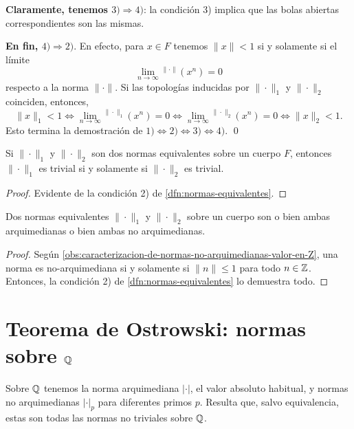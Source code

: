 \documentclass{article}
\numberwithin{equation}{section}
\theoremstyle{definition}
\begin{document}
\vspace{1em}

\noindent\textbf{Claramente, tenemos $3) \Rightarrow 4)$}: la condición 3)
implica que las bolas abiertas correspondientes son las mismas.

\vspace{1em}

\noindent\textbf{En fin, $4) \Rightarrow 2)$}. En efecto, para $x\in F$ tenemos
$\|x\| < 1$ si y solamente si el límite
$$\lim_{n\to\infty}\!\!{}^{\|\cdot\|} (x^n) = 0$$
respecto a la norma $\|\cdot\|$. Si las topologías inducidas por $\|\cdot\|_1$
y $\|\cdot\|_2$ coinciden, entonces,
\[ \|x\|_1 < 1 \iff
   \lim_{n\to\infty}\!\!{}^{\|\cdot\|_1} (x^n) = 0 \iff
   \lim_{n\to\infty}\!\!{}^{\|\cdot\|_2} (x^n) = 0 \iff
   \|x\|_2 < 1. \]
Esto termina la demostración de
$1) \Leftrightarrow 2) \Leftrightarrow 3) \Leftrightarrow 4)$. \qed

\begin{observacion}
  Si $\|\cdot\|_1$ y $\|\cdot\|_2$ son dos normas equivalentes sobre un cuerpo
  $F$, entonces $\|\cdot\|_1$ es trivial si y solamente si $\|\cdot\|_2$ es
  trivial.

  \begin{proof}
    Evidente de la condición 2) de \ref{dfn:normas-equivalentes}.
  \end{proof}
\end{observacion}

\begin{observacion}
  Dos normas equivalentes $\|\cdot\|_1$ y $\|\cdot\|_2$ sobre un cuerpo son
  o bien ambas arquimedianas o bien ambas no arquimedianas.

  \begin{proof}
    Según \ref{obs:caracterizacion-de-normas-no-arquimedianas-valor-en-Z},
    una norma es no-arquimediana si y solamente si $\|n\| \le 1$ para todo
    $n\in\mathbb{Z}$. Entonces, la condición 2) de \ref{dfn:normas-equivalentes}
    lo demuestra todo.
  \end{proof}
\end{observacion}


\section{Teorema de Ostrowski: normas sobre $\mathbb{Q}$}
\label{sec:ostrowski-para-Q}

Sobre $\mathbb{Q}$ tenemos la norma arquimediana $|\cdot|$, el valor absoluto habitual,
y normas no arquimedianas $|\cdot|_p$ para diferentes primos $p$. Resulta que,
salvo equivalencia, estas son todas las normas no triviales sobre $\mathbb{Q}$.
\end{document}
